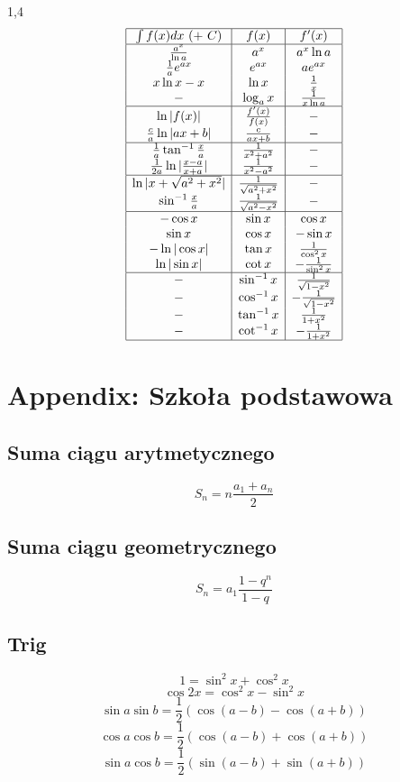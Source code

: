 \documentclass[11pt]{article}
\begin{document}
\begin{spacing}{1,4} \[ \begin{array}{|c|c|c|}
	\hline
		\int f(x) dx\ (+\ C) & f(x) & f'(x) \\
	\hline
		\frac{a^x}{\ln a} & a^x & a^x \ln a \\
		\frac{1}{a} e^{ax} & e^{ax} & ae^{ax} \\
		x \ln x - x & \ln x & \frac{1}{x} \\
		-    & \log_a x & \frac{1}{x \ln a} \\
	\hline
		\ln|f(x)| & \frac{f'(x)}{f(x)} & - \\
		\frac{c}{a} \ln|ax + b| & \frac{c}{ax +b} & - \\
	\hline
		\frac{1}{a} \tan^{-1} \frac{x}{a} & \frac{1}{x^2 + a^2} & - \\
		\frac{1}{2a} \ln|\frac{x - a}{x + a}| & \frac{1}{x^2 - a^2} & - \\
	\hline
		\ln|x + \sqrt{a^2 + x^2}| & \frac{1}{\sqrt{a^2 + x^2}} & - \\
		\sin^{-1} \frac{x}{a} & \frac{1}{\sqrt{a^2 - x^2}} & - \\
	\hline
		-\cos x		& \sin x	&  \cos x \\
		 \sin x		& \cos x	& -\sin x \\
		-\ln|\cos x|	& \tan x	&  \frac{1}{\cos^2 x} \\
		 \ln|\sin x|	& \cot x	& -\frac{1}{\sin^2 x} \\
	\hline
		 - & \sin^{-1} x	&  \frac{1}{\sqrt{1-x^2}} \\
		 - & \cos^{-1} x	& -\frac{1}{\sqrt{1-x^2}} \\
		 - & \tan^{-1} x	& \frac{1}{1+x^2} \\
		 - & \cot^{-1} x	& -\frac{1}{1+x^2} \\
	\hline
\end{array} \] \end{spacing}

\pagebreak

\section{Appendix: Szkoła podstawowa}

\subsection{Suma ciągu arytmetycznego}
$$
	S_n = n \frac{a_1 + a_n}{2}
$$

\subsection{Suma ciągu geometrycznego}
$$
	S_n = a_1 \frac{1 - q^n}{1 - q}
$$

\subsection{Trig}
$$1 = \sin^2 x + \cos^2 x$$
$$\cos 2x = \cos^2 x - \sin^2 x$$
$$\sin a \sin b = \frac{1}{2}(\cos(a - b) - \cos(a + b))$$
$$\cos a \cos b = \frac{1}{2}(\cos(a - b) + \cos(a + b))$$
$$\sin a \cos b = \frac{1}{2}(\sin(a - b) + \sin(a + b))$$
\end{document}
